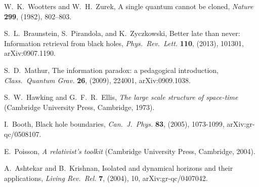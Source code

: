\documentclass[12pt]{article}
\begin{document}
\begin{thebibliography}{999}
 W.~K.\ Wootters and W.~H.\ Zurek, A single 
quantum cannot be cloned, \emph{Nature} {\bf 299}, (1982), 
802--803.

  S.~L.\ Braunstein, S.\ Pirandola, and K.\ Zyczkowski,
Better late than never: Information retrieval from black holes,
\emph{Phys.\ Rev.\ Lett.} {\bf 110},  (2013), 101301,
arXiv:0907.1190.

 S.~D.\ Mathur, The information paradox: 
a pedagogical introduction, \emph{Class.\ Quantum Grav.} {\bf 26},
(2009),  224001, arXiv:0909.1038.

  S.~W.\ Hawking and G.~F.~R.\ Ellis,
\emph{The large scale structure of space-time} (Cambridge
University Press, Cambridge, 1973).

 I.\ Booth, Black hole boundaries, \emph{Can.\
J.\ Phys.} {\bf 83}, (2005), 1073-1099, arXiv:gr-qc/0508107.

 E.\ Poisson, \emph{A relativist's toolkit} (Cambridge
University Press, Cambridge, 2004).

 A.\ Ashtekar and B.\ Krishnan, Isolated and 
dynamical horizons and their applications, \emph{Living Rev.\ Rel.}
{\bf 7}, (2004), 10, arXiv:gr-qc/0407042.

\end{thebibliography}
 
\end{document}
